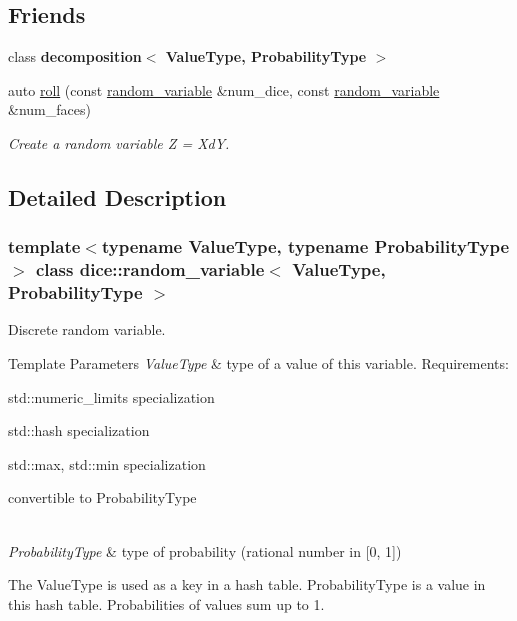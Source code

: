 \subsection*{Friends}
\begin{DoxyCompactItemize}
\item 
\mbox{\label{classdice_1_1random__variable_a576b2a57ac76cbde31cb0826a5cd1d6f}} 
class {\bfseries decomposition$<$ Value\+Type, Probability\+Type $>$}
\item 
auto \mbox{\hyperlink{classdice_1_1random__variable_a1ee237915048ab90f60508a75ba39c40}{roll}} (const \mbox{\hyperlink{classdice_1_1random__variable}{random\+\_\+variable}} \&num\+\_\+dice, const \mbox{\hyperlink{classdice_1_1random__variable}{random\+\_\+variable}} \&num\+\_\+faces)
\begin{DoxyCompactList}\small\item\em Create a random variable Z = XdY. \end{DoxyCompactList}\end{DoxyCompactItemize}


\subsection{Detailed Description}
\subsubsection*{template$<$typename Value\+Type, typename Probability\+Type$>$\newline
class dice\+::random\+\_\+variable$<$ Value\+Type, Probability\+Type $>$}

Discrete random variable. 


\begin{DoxyTemplParams}{Template Parameters}
{\em Value\+Type} & type of a value of this variable. Requirements\+:
\begin{DoxyItemize}
\item std\+::numeric\+\_\+limits specialization
\item std\+::hash specialization
\item std\+::max, std\+::min specialization
\item convertible to Probability\+Type 
\end{DoxyItemize}\\
\hline
{\em Probability\+Type} & type of probability (rational number in \mbox{[}0, 1\mbox{]})\\
\hline
\end{DoxyTemplParams}
The Value\+Type is used as a key in a hash table. Probability\+Type is a value in this hash table. Probabilities of values sum up to 1.

